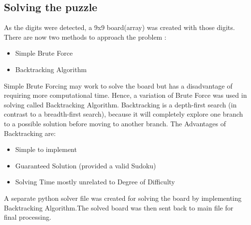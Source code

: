 \documentclass[a4paper,12pt]{article}
\begin{document}
\subsection{Solving the puzzle}
As the digits were detected, a 9x9 board(array) was created with those digits. There are now two methods to approach the problem : 
\begin{itemize}
    \item Simple Brute Force
    \item Backtracking Algorithm
\end{itemize}
Simple Brute Forcing may work to solve the board but has a disadvantage of requiring more computational time. Hence, a variation of Brute Force was used in solving called Backtracking Algorithm\cite{solver_algos}. Backtracking is a depth-first search (in contrast to a breadth-first search), because it will completely explore one branch to a possible solution before moving to another branch.
The Advantages of Backtracking are:
\begin{itemize}
    \item Simple to implement
    \item Guaranteed Solution (provided a valid Sudoku)\cite{solver_algos}
    \item Solving Time mostly unrelated to Degree of Difficulty
\end{itemize}
A separate python solver file was created for solving the board by implementing Backtracking Algorithm\cite{bt_twt}.The solved board was then sent back to main file for final processing.  
\end{document}
